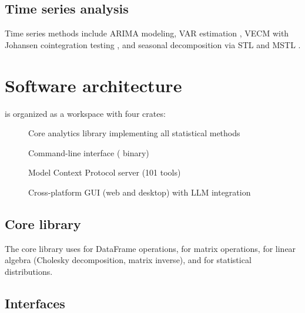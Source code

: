\subsection{Time series analysis} \label{sec:timeseries}

Time series methods include ARIMA modeling, VAR estimation \citep{Sims:1980},
VECM with Johansen cointegration testing \citep{Johansen:1991}, and seasonal
decomposition via STL \citep{Cleveland+Cleveland+McRae+Terpenning:1990} and
MSTL \citep{Hyndman+Khandakar:2008}.



\section{Software architecture} \label{sec:architecture}


 is organized as a  workspace with four crates:

\begin{description}
  \item[] Core analytics library implementing all statistical methods
  \item[] Command-line interface ( binary)
  \item[] Model Context Protocol server (101 tools)
  \item[] Cross-platform GUI (web and desktop) with LLM integration
\end{description}

\subsection{Core library}

The core library uses  \citep{polars} for DataFrame operations,
 \citep{ndarray} for matrix operations,  \citep{faer}
for linear algebra (Cholesky decomposition, matrix inverse), and 
\citep{statrs} for statistical distributions.

\subsection{Interfaces}

